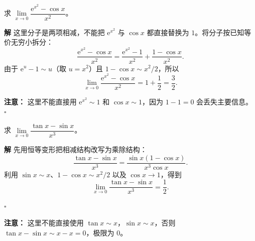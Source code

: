 \documentclass[fontset=fandol]{ctexart}
\newenvironment{custom}[1]{\par\noindent\textbf{#1}\quad}{\par\vspace{0.8em}}
\newenvironment{solution}{\par\noindent\textbf{解}\quad}{\hfill$\square$\par\vspace{0.8em}}
\newcommand{\ee}{\mathrm{e}}
\begin{document}
\begin{example}[加减结构的拆分]
求 \(\lim\limits_{x \to 0} \dfrac{\ee^{x^2} - \cos x}{x^2}\)。
\end{example}
\begin{solution}
这里分子是两项相减，不能把 \(\ee^{x^2}\) 与 \(\cos x\) 都直接替换为 \(1\)。将分子按已知等价无穷小拆分：
\[
\frac{\ee^{x^2}-\cos x}{x^2}
=\frac{\ee^{x^2}-1}{x^2}+\frac{1-\cos x}{x^2}.
\]
由于 \(\ee^u-1\sim u\)（取 \(u=x^2\)）且 \(1-\cos x\sim x^2/2\)，所以
\[
\lim_{x\to0}\frac{\ee^{x^2}-\cos x}{x^2}
=1+\frac12=\frac32.
\]

\textbf{注意：} 这里不能直接用 \(\ee^{x^2}\sim1\) 和 \(\cos x\sim1\)，因为 \(1-1=0\) 会丢失主要信息。
\end{solution}

\begin{example}[加减结构中的易错点]
求 \(\lim\limits_{x \to 0} \dfrac{\tan x - \sin x}{x^3}\)。




\begin{solution}
	先用恒等变形把相减结构改写为乘除结构：
	\[
	\frac{\tan x-\sin x}{x^3}
	=\frac{\sin x(1-\cos x)}{x^3\cos x}.
	\]
	利用 \(\sin x\sim x\)、\(1-\cos x\sim x^2/2\) 以及 \(\cos x\to1\)，得到
	\[
	\lim_{x\to0}\frac{\tan x-\sin x}{x^3}
	=\frac12.
	\]
	
\end{solution}

\textbf{注意：} 这里不能直接使用 \(\tan x \sim x\)，\(\sin x \sim x\)，否则 \(\tan x - \sin x \sim x - x = 0\)，极限为 0。

\end{example}
\end{document}
